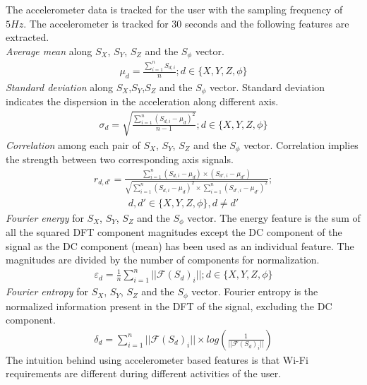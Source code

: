 The accelerometer data is tracked for the user with the sampling frequency of $5Hz$. The accelerometer is tracked for 30 seconds and the following features are extracted. \\
\emph{Average mean} along $S_X$, $S_Y$, $S_Z$ and the $S_\phi$ vector. 
\begin{align*}
\mu_d = \frac{\sum_{i=1}^n S_{d,i}}{n}; d \in \{X, Y, Z, \phi\}
\end{align*}
\emph{Standard deviation} along $S_X$,$S_Y$,$S_Z$ and the $S_\phi$ vector. Standard deviation indicates the dispersion in the acceleration along different axis. 
\begin{align*}
\sigma_d = \sqrt{\frac{\sum_{i=1}^n (S_{d,i} - \mu_d)^2 }{n-1}} ; d \in \{X, Y, Z, \phi\}
\end{align*} 
\emph{Correlation} among each pair of $S_X$, $S_Y$, $S_Z$ and the $S_\phi$ vector. Correlation implies the strength between two corresponding axis signals. 
\begin{align*}
r_{d,d'} = \frac{\sum_{i=1}^n (S_{d,i}-\mu_d) \times (S_{d',i}-\mu_{d'}) }{\sqrt{\sum_{i=1}^n (S_{d,i}-\mu_d)^2 \times \sum_{i=1}^n (S_{d',i}-\mu_{d'})^2}} ;
\end{align*} 
\begin{align*}
 d,d' \in \{X, Y, Z, \phi\} ,	 d \neq d'
\end{align*} 
\emph{Fourier energy} for $S_X$, $S_Y$, $S_Z$ and the $S_\phi$ vector. The energy feature is the sum of all the squared DFT component magnitudes 
except the DC component of the signal as the DC component (mean) has been used as an individual feature. The magnitudes are divided by the number of components for normalization.
\begin{align*}
\varepsilon_d = \frac{1}{n}\sum_{i=1}^n || \mathcal{F}(S_d)_i||; d \in \{X,Y,Z,\phi\}
\end{align*} 
\emph{Fourier entropy} for $S_X$, $S_Y$, $S_Z$ and the $S_\phi$ vector. Fourier entropy is the normalized information present in the DFT of the signal, excluding the DC component. 
\begin{align*}
\delta_d = \sum_{i=1}^n ||\mathcal{F}(S_d)_i|| \times log (\frac{1}{|| \mathcal{F}(S_d)_i||})
\end{align*} 
The intuition behind using accelerometer based features is that Wi-Fi requirements are different during different activities of the user. 

